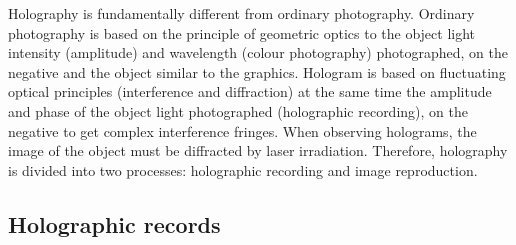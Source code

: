 \documentclass[UTF8]{article}
\begin{document}
	Holography is fundamentally different from ordinary photography. Ordinary photography is based on the principle of geometric optics to the object light intensity (amplitude) and wavelength (colour photography) photographed, on the negative and the object similar to the graphics. Hologram is based on fluctuating optical principles (interference and diffraction) at the same time the amplitude and phase of the object light photographed (holographic recording), on the negative to get complex interference fringes. When observing holograms, the image of the object must be diffracted by laser irradiation. Therefore, holography is divided into two processes: holographic recording and image reproduction.
	 
    \subsection{Holographic records}
\end{document}
